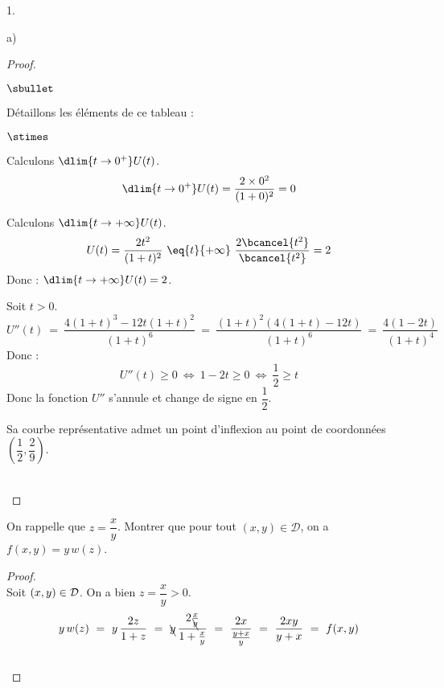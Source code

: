 \documentclass[11pt]{article}%
\begin{document}
\begin{noliste}{1.}
\begin{noliste}{a)}
\begin{proof}
\begin{noliste}{$\sbullet$}
    \begin{center}
     \end{center}
     
     Détaillons les éléments de ce tableau :
     \begin{noliste}{$\stimes$}
      \item Calculons $\dlim{t\to 0^+} U(t)$.
      \[
       \dlim{t\to 0^+} U(t) = \dfrac{2 \times 0^2}{(1+0)^2} = 0
      \]
      \item Calculons $\dlim{t\to +\infty} U(t)$.
      \[
       U(t) = \dfrac{2t^2}{(1+t)^2} \ \eq{t}{+\infty} \ 
       \dfrac{2 \bcancel{t^2}}{\bcancel{t^2}} = 2
      \]
      Donc : $\dlim{t\to +\infty} U(t)=2$.
     \end{noliste}
     
     
     \newpage
     

     \item Soit $t>0$.
     \[
      U''(t) \ = \ \dfrac{4(1+t)^3 - 12t(1+t)^2}{(1+t)^6}
      \ = \ \dfrac{(1+t)^2\left( 4(1+t) -12t\right)}{(1+t)^6}
      \ = \ \dfrac{4(1-2t)}{(1+t)^4}
     \]
     Donc :
     \[
      U''(t) \geq 0 \ \Leftrightarrow \ 1-2t \geq 0 
      \ \Leftrightarrow \ \dfrac{1}{2} \geq t
     \]
     Donc la fonction $U''$ s'annule et change de signe en 
     $\dfrac{1}{2}$.
   \end{noliste}
   \begin{remark}
     Sa courbe représentative admet un point d'inflexion au point
     de coordonnées $\left(\dfrac{1}{2},\dfrac{2}{9}\right)$.
   \end{remark}~\\[-1.4cm]
 \end{proof}
  
  \item On rappelle que $z=\dfrac{x}{y}$. Montrer que pour tout $(x,y) 
  \in \mathcal{D}$, on a $f(x,y)=y \, w(z)$.
  
  \begin{proof}~\\
   Soit $(x,y) \in {\cal D}$. On a bien $z=\dfrac{x}{y} >0$.
   \[
    y \, w(z) \ = \ y \, \dfrac{2z}{1+z} \ = \ \bcancel{y} \, 
    \dfrac{2 \frac{x}{\bcancel{y}}}{1+\frac{x}{y}}
    \ = \ \dfrac{2x}{\frac{y+x}{y}} \ = \ \dfrac{2xy}{y+x} \ = \ f(x,y)
   \]
   ~\\[-1cm]
  \end{proof}


\end{noliste}
\end{noliste}
\end{document}
